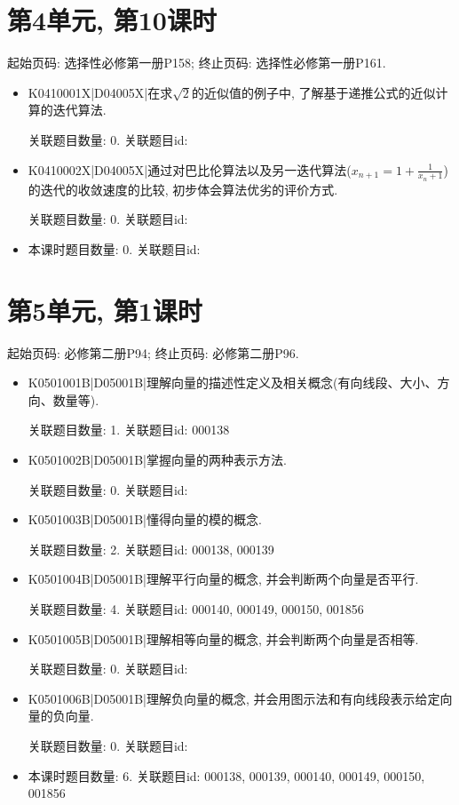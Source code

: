 \section*{第4单元, 第10课时}
起始页码: 选择性必修第一册P158; 终止页码: 选择性必修第一册P161.
\begin{itemize}
\item K0410001X|D04005X|在求$\sqrt 2$的近似值的例子中, 了解基于递推公式的近似计算的迭代算法.

关联题目数量: 0. 关联题目id: 

\item K0410002X|D04005X|通过对巴比伦算法以及另一迭代算法($x_{n+1}=1+\frac{1}{x_{n}+1}$)的迭代的收敛速度的比较, 初步体会算法优劣的评价方式.

关联题目数量: 0. 关联题目id: 

\item 本课时题目数量: 0. 关联题目id: 

\end{itemize}

\section*{第5单元, 第1课时}
起始页码: 必修第二册P94; 终止页码: 必修第二册P96.
\begin{itemize}
\item K0501001B|D05001B|理解向量的描述性定义及相关概念(有向线段、大小、方向、数量等).

关联题目数量: 1. 关联题目id: 000138

\item K0501002B|D05001B|掌握向量的两种表示方法.

关联题目数量: 0. 关联题目id: 

\item K0501003B|D05001B|懂得向量的模的概念.

关联题目数量: 2. 关联题目id: 000138, 000139

\item K0501004B|D05001B|理解平行向量的概念, 并会判断两个向量是否平行.

关联题目数量: 4. 关联题目id: 000140, 000149, 000150, 001856

\item K0501005B|D05001B|理解相等向量的概念, 并会判断两个向量是否相等.

关联题目数量: 0. 关联题目id: 

\item K0501006B|D05001B|理解负向量的概念, 并会用图示法和有向线段表示给定向量的负向量.

关联题目数量: 0. 关联题目id: 

\item 本课时题目数量: 6. 关联题目id: 000138, 000139, 000140, 000149, 000150, 001856

\end{itemize}

